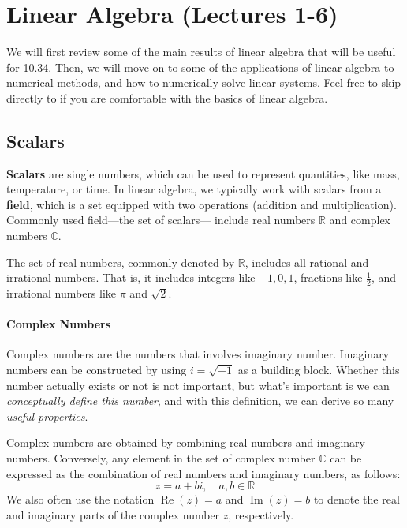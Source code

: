 \section{Linear Algebra (Lectures 1-6)}
We will first review some of the main results of linear algebra that will be useful for 10.34. Then, we will move on to some of the applications of linear algebra to numerical methods, and how to numerically solve linear systems. Feel free to skip directly to  if you are comfortable with the basics of linear algebra.

\subsection{Scalars}
\textbf{Scalars} are single numbers, which can be used to represent quantities, like mass, temperature, or time. In linear algebra, we typically work with scalars from a \textbf{field}, which is a set equipped with two operations (addition and multiplication). Commonly used field---the set of scalars--- include real numbers $ \mathbb{R} $ and complex numbers $ \mathbb{C} $.

The set of real numbers, commonly denoted by $ \mathbb{R} $, includes all rational and irrational numbers.
That is, it includes integers like $-1, 0, 1$, fractions like $ \frac{1}{2} $, and irrational numbers like $ \pi $ and $ \sqrt{2} $.


\paragraph*{Complex Numbers}
Complex numbers are the numbers that involves imaginary number.
Imaginary numbers can be constructed by using $i=\sqrt{-1}$ as a building block.
Whether this number actually exists or not is not important, but what’s important is we can \emph{conceptually define this number}, and with this definition, we can derive so many \emph{useful properties}.

Complex numbers are obtained by combining real numbers and imaginary numbers.
Conversely, any element in the set of complex number $\mathbb{C}$ can be expressed as the combination of real numbers and imaginary numbers, as follows:
\begin{equation*}
    z = a + b i, \quad a, b \in \mathbb{R}
\end{equation*}
We also often use the notation $ \operatorname{Re}(z) = a $ and $ \operatorname{Im}(z) = b $ to denote the real and imaginary parts of the complex number $ z $, respectively.

